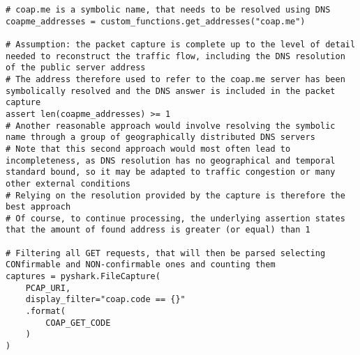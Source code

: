 \documentclass[a4paper,11pt]{article} %
\begin{document}
    \begin{verbatim}
# coap.me is a symbolic name, that needs to be resolved using DNS
coapme_addresses = custom_functions.get_addresses("coap.me")

# Assumption: the packet capture is complete up to the level of detail needed to reconstruct the traffic flow, including the DNS resolution of the public server address
# The address therefore used to refer to the coap.me server has been symbolically resolved and the DNS answer is included in the packet capture
assert len(coapme_addresses) >= 1
# Another reasonable approach would involve resolving the symbolic name through a group of geographically distributed DNS servers
# Note that this second approach would most often lead to incompleteness, as DNS resolution has no geographical and temporal standard bound, so it may be adapted to traffic congestion or many other external conditions
# Relying on the resolution provided by the capture is therefore the best approach
# Of course, to continue processing, the underlying assertion states that the amount of found address is greater (or equal) than 1

# Filtering all GET requests, that will then be parsed selecting CONfirmable and NON-confirmable ones and counting them
captures = pyshark.FileCapture(
    PCAP_URI,
    display_filter="coap.code == {}"
    .format(
        COAP_GET_CODE
    )
)


\end{verbatim}
\end{document}
